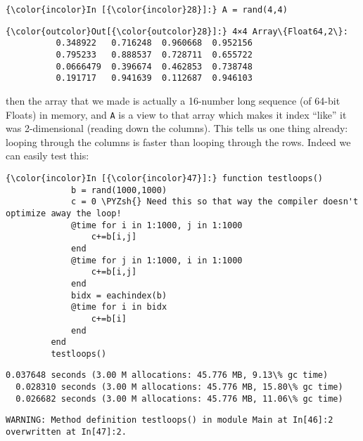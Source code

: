 \documentclass[11pt]{article}
\def\PYZsh{\char`\#}
\begin{document}
    \begin{Verbatim}[commandchars=\\\{\}]
{\color{incolor}In [{\color{incolor}28}]:} A = rand(4,4)
\end{Verbatim}

            \begin{Verbatim}[commandchars=\\\{\}]
{\color{outcolor}Out[{\color{outcolor}28}]:} 4×4 Array\{Float64,2\}:
          0.348922   0.716248  0.960668  0.952156
          0.795233   0.888537  0.728711  0.655722
          0.0666479  0.396674  0.462853  0.738748
          0.191717   0.941639  0.112687  0.946103
\end{Verbatim}
        
    then the array that we made is actually a 16-number long sequence (of
64-bit Floats) in memory, and \texttt{A} is a view to that array which
makes it index ``like'' it was 2-dimensional (reading down the columns).
This tells us one thing already: looping through the columns is faster
than looping through the rows. Indeed we can easily test this:

    \begin{Verbatim}[commandchars=\\\{\}]
{\color{incolor}In [{\color{incolor}47}]:} function testloops()
             b = rand(1000,1000)
             c = 0 \PYZsh{} Need this so that way the compiler doesn't optimize away the loop!
             @time for i in 1:1000, j in 1:1000
                 c+=b[i,j]
             end
             @time for j in 1:1000, i in 1:1000
                 c+=b[i,j]
             end
             bidx = eachindex(b)
             @time for i in bidx
                 c+=b[i]
             end
         end
         testloops()
\end{Verbatim}

    \begin{Verbatim}[commandchars=\\\{\}]
  0.037648 seconds (3.00 M allocations: 45.776 MB, 9.13\% gc time)
  0.028310 seconds (3.00 M allocations: 45.776 MB, 15.80\% gc time)
  0.026682 seconds (3.00 M allocations: 45.776 MB, 11.06\% gc time)

    \end{Verbatim}

    \begin{Verbatim}[commandchars=\\\{\}]
WARNING: Method definition testloops() in module Main at In[46]:2 overwritten at In[47]:2.

    \end{Verbatim}
\end{document}
